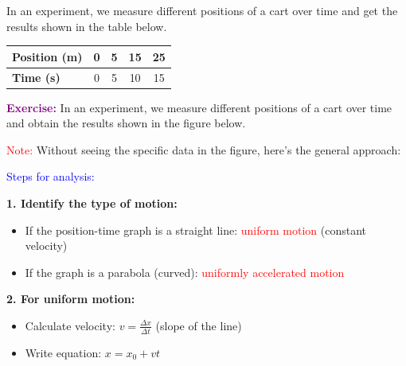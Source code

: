 \begin{exercise}
    In an experiment, we measure different positions of a cart over time and get the results shown in the table below.

    \begin{table}[H]
        \centering
        \renewcommand{\arraystretch}{1.5}
        \begin{tabular}{Occcc}
            \bottomrule
            \textcolor{ocre}{\textbf{Position (\unit{\metre})}} & 0 & 5 & 15 & 25 \\
            \hline
            \textcolor{ocre}{\textbf{Time (\unit{\s})}}         & 0 & 5 & 10 & 15 \\
            \toprule
        \end{tabular}
        \label{tab:ejercicio1}
    \end{table}
%
    \begin{solu}
        \textbf{\textcolor{purple}{Exercise:}} In an experiment, we measure different positions of a cart over time and obtain the results shown in the figure below.

        \vspace{0.3cm}

        \textcolor{red}{Note:} Without seeing the specific data in the figure, here's the general approach:

        \textcolor{blue}{Steps for analysis:}

        \textbf{1. Identify the type of motion:}
        \begin{itemize}
            \item If the position-time graph is a straight line: \textcolor{red}{uniform motion} (constant velocity)
            \item If the graph is a parabola (curved): \textcolor{red}{uniformly accelerated motion}
        \end{itemize}

        \textbf{2. For uniform motion:}
        \begin{itemize}
            \item Calculate velocity: $v = \frac{\Delta x}{\Delta t}$ (slope of the line)
            \item Write equation: $x = x_0 + vt$
        \end{itemize}


\end{solu}
\end{exercise}
